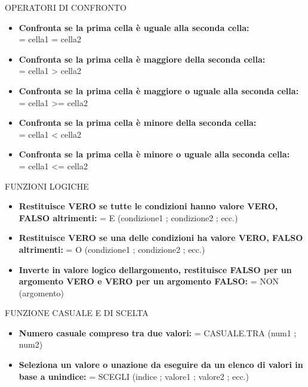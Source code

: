 \documentclass[aspectratio=1610]{beamer}
\begin{document}
\begin{frame}{OPERATORI DI CONFRONTO}
    \begin{itemize}
        \justifying
        \item \textbf{Confronta se la prima cella è uguale alla seconda cella:} \\ = cella1 = cella2
        \item \textbf{Confronta se la prima cella è maggiore della seconda cella:} \\ = cella1 \textgreater{} cella2
        \item \textbf{Confronta se la prima cella è maggiore o uguale alla seconda cella:} \\ = cella1 \textgreater= cella2
        \item \textbf{Confronta se la prima cella è minore della seconda cella:} \\ = cella1 \textless{} cella2
        \item \textbf{Confronta se la prima cella è minore o uguale alla seconda cella:} \\ = cella1 \textless= cella2
    \end{itemize}
\end{frame}

\begin{frame}{FUNZIONI LOGICHE}
    \begin{itemize}
        \justifying
        \item \textbf{Restituisce VERO se tutte le condizioni hanno valore VERO, 
        FALSO altrimenti:} = E (condizione1 ; condizione2 ; ecc.)
        \item \textbf{Restituisce VERO se una delle condizioni ha valore VERO, FALSO 
        altrimenti:} = O (condizione1 ; condizione2 ; ecc.)
        \item \textbf{Inverte in valore logico dell\textquotesingle argomento, 
        restituisce FALSO per un argomento VERO e VERO per un argomento FALSO:} = NON (argomento)
    \end{itemize}
\end{frame}

\begin{frame}{FUNZIONE CASUALE E DI SCELTA}
    \begin{itemize}
        \justifying
        \item \textbf{Numero casuale compreso tra due valori:} = CASUALE.TRA (num1 ; num2)
        \item \textbf{Seleziona un valore o un\textquotesingle azione da eseguire da 
        un elenco di valori in base a un\textquotesingle indice:} = SCEGLI (indice ; valore1 ; valore2 ; ecc.)
    \end{itemize}
\end{frame}
\end{document}
